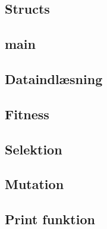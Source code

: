 

\subsection{Structs}
  

\subsection{main}
  

\subsection{Dataindlæsning}
  

\subsection{Fitness}
  

\subsection{Selektion}
  

\subsection{Mutation}
  

\subsection{Print funktion}

